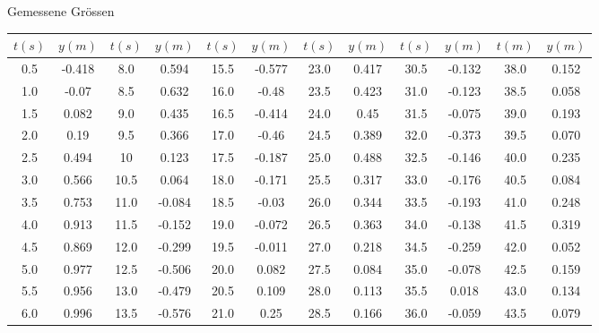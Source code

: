 \begin{center}
    \begin{threeparttable}
        \caption{Gemessene Gr\"ossen}
        \begin{tabular}{*{12}{c}}
            \toprule
            $t(s)$  &  $y(m)$   &  $t(s)$   &  $y(m)$   &  $t(s)$  &  $y(m)$    &  $t(s)$   & $y(m)$    &  $t(s)$   &  $y(m)$   &  $t(m)$   &  $y(m)$ \\
            \midrule
            0.5     & -0.418    & 8.0       & 0.594     & 15.5     & -0.577     & 23.0      & 0.417     & 30.5      & -0.132    & 38.0      & 0.152   \\
            1.0     & -0.07     & 8.5       & 0.632     & 16.0     & -0.48      & 23.5      & 0.423     & 31.0      & -0.123    & 38.5      & 0.058   \\
            1.5     & 0.082     & 9.0       & 0.435     & 16.5     & -0.414     & 24.0      & 0.45      & 31.5      & -0.075    & 39.0      & 0.193   \\
            2.0     & 0.19      & 9.5       & 0.366     & 17.0     & -0.46      & 24.5      & 0.389     & 32.0      & -0.373    & 39.5      & 0.070   \\
            2.5     & 0.494     & 10        & 0.123     & 17.5     & -0.187     & 25.0      & 0.488     & 32.5      & -0.146    & 40.0      & 0.235   \\
            3.0     & 0.566     & 10.5      & 0.064     & 18.0     & -0.171     & 25.5      & 0.317     & 33.0      & -0.176    & 40.5      & 0.084   \\
            3.5     & 0.753     & 11.0      & -0.084    & 18.5     & -0.03      & 26.0      & 0.344     & 33.5      & -0.193    & 41.0      & 0.248   \\
            4.0     & 0.913     & 11.5      & -0.152    & 19.0     & -0.072     & 26.5      & 0.363     & 34.0      & -0.138    & 41.5      & 0.319   \\
            4.5     & 0.869     & 12.0      & -0.299    & 19.5     & -0.011     & 27.0      & 0.218     & 34.5      & -0.259    & 42.0      & 0.052   \\
            5.0     & 0.977     & 12.5      & -0.506    & 20.0     & 0.082      & 27.5      & 0.084     & 35.0      & -0.078    & 42.5      & 0.159   \\
            5.5     & 0.956     & 13.0      & -0.479    & 20.5     & 0.109      & 28.0      & 0.113     & 35.5      & 0.018     & 43.0      & 0.134   \\
            6.0     & 0.996     & 13.5      & -0.576    & 21.0     & 0.25       & 28.5      & 0.166     & 36.0      & -0.059    & 43.5      & 0.079   \\

\end{tabular}
\end{threeparttable}
\end{center}
